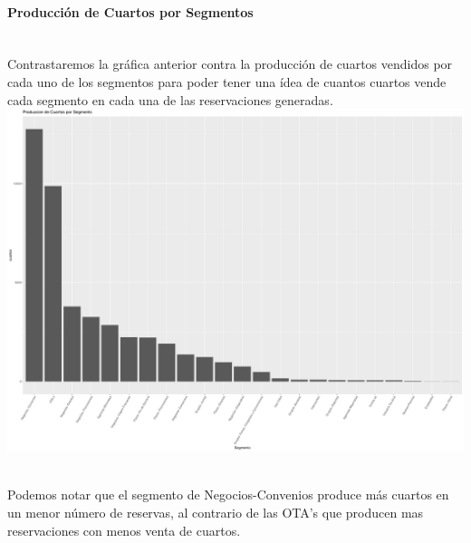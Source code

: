 \documentclass{article}\usepackage[]{graphicx}\usepackage[]{color}
\makeatletter
\def\maxwidth{ %
  \ifdim\Gin@nat@width>\linewidth
    \linewidth
  \else
    \Gin@nat@width
  \fi
}
\newenvironment{knitrout}{}{} %
\makeatother
\begin{document}
\paragraph{Producción de Cuartos por Segmentos} ~\\
Contrastaremos la gráfica anterior contra la producción de cuartos vendidos por cada uno de los segmentos para poder tener una ídea de cuantos cuartos vende cada segmento en cada una de las reservaciones generadas.
~\\
\begin{knitrout}
\color{fgcolor}
\includegraphics[width=\maxwidth]{figures/SegmentosMercadoCNO-1} 

\end{knitrout}
~\\
Podemos notar que el segmento de Negocios-Convenios produce más cuartos en un menor número de reservas, al contrario de las OTA's que producen mas reservaciones con menos venta de cuartos.
\end{document}
